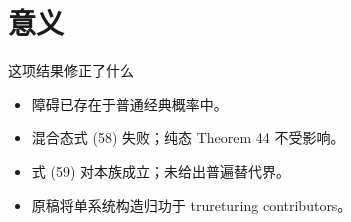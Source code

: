 \documentclass{beamer}
\begin{document}
\section{意义}
\begin{frame}{这项结果修正了什么}
\begin{itemize}
\item 障碍已存在于普通经典概率中。
\item 混合态式 (58) 失败；纯态 Theorem 44 不受影响。
\item 式 (59) 对本族成立；未给出普遍替代界。
\item 原稿将单系统构造归功于 trureturing contributors。
\end{itemize}
\end{frame}
\appendix
\end{document}
